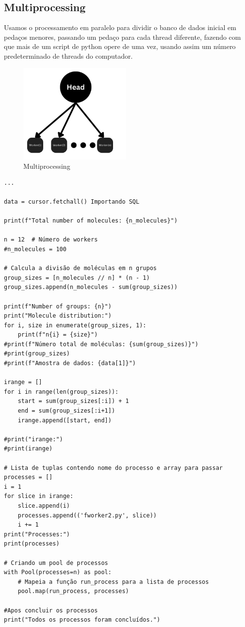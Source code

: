 \documentclass[11pt,a4paper]{article}
\begin{document}
\subsection{Multiprocessing}

Usamos o processamento em paralelo para dividir o banco de dados inicial em pedaços menores, passando um pedaço para cada thread diferente, fazendo com que mais de um script de python opere de uma vez, usando assim um número predeterminado de threads do computador.

\begin{figure}[h]
    \centering
    \includegraphics[width=0.5\textwidth]{Images/Multi.png}
    \caption{Multiprocessing}
    \label{fig:ir_spectrum}
\end{figure}

\begin{verbatim}
...

data = cursor.fetchall() Importando SQL

print(f"Total number of molecules: {n_molecules}")

n = 12  # Número de workers
#n_molecules = 100

# Calcula a divisão de moléculas em n grupos
group_sizes = [n_molecules // n] * (n - 1)
group_sizes.append(n_molecules - sum(group_sizes))

print(f"Number of groups: {n}")
print("Molecule distribution:")
for i, size in enumerate(group_sizes, 1):
    print(f"n{i} = {size}")
#print(f"Número total de moléculas: {sum(group_sizes)}")
#print(group_sizes)
#print(f"Amostra de dados: {data[1]}")

irange = []
for i in range(len(group_sizes)):
    start = sum(group_sizes[:i]) + 1
    end = sum(group_sizes[:i+1])
    irange.append([start, end])

#print("irange:")
#print(irange)

# Lista de tuplas contendo nome do processo e array para passar
processes = []
i = 1
for slice in irange:
    slice.append(i)
    processes.append(('fworker2.py', slice))
    i += 1
print("Processes:")
print(processes)

# Criando um pool de processos
with Pool(processes=n) as pool:
    # Mapeia a função run_process para a lista de processos
    pool.map(run_process, processes)

#Apos concluir os processos
print("Todos os processos foram concluídos.")

\end{verbatim}
\end{document}
